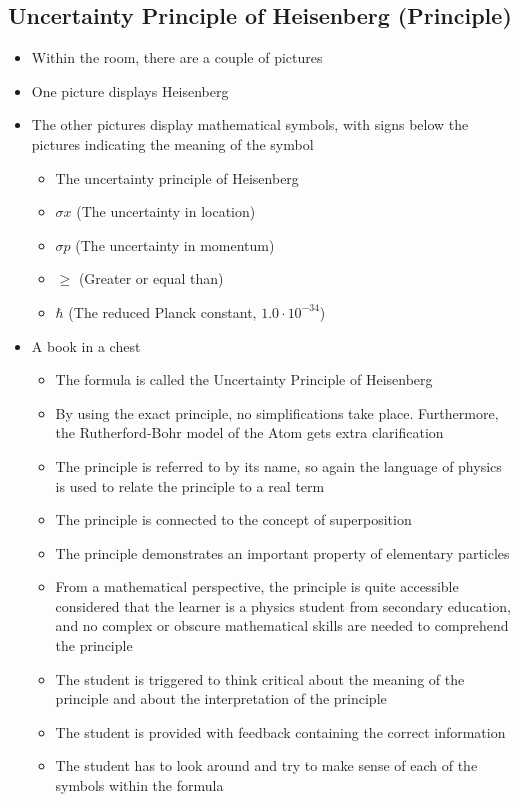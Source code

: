 \documentclass[11pt,twoside]{report} %
\begin{document}
\subsection{Uncertainty Principle of Heisenberg (Principle)}
\begin{itemize}
	\item Within the room, there are a couple of pictures
	\item One picture displays Heisenberg
	\item The other pictures display mathematical symbols, with signs below the pictures indicating the meaning of the symbol
	\begin{itemize}
		\item The uncertainty principle of Heisenberg
		\item $\sigma x$ (The uncertainty in location)
		\item $\sigma p$ (The uncertainty in momentum)
		\item $\geq$ (Greater or equal than)
		\item $\hbar$ (The reduced Planck constant, $1.0 \cdot 10^{-34}$)
	\end{itemize}
	\item A book in a chest
	\begin{itemize}
		\item The formula is called the Uncertainty Principle of Heisenberg
		\item By using the exact principle, no simplifications take place. Furthermore, the Rutherford-Bohr model of the Atom gets extra clarification
		\item The principle is referred to by its name, so again the language of physics is used to relate the principle to a real term
		\item The principle is connected to the concept of superposition
		\item The principle demonstrates an important property of elementary particles
		\item From a mathematical perspective, the principle is quite accessible considered that the learner is a physics student from secondary education, and no complex or obscure mathematical skills are needed to comprehend the principle
		\item The student is triggered to think critical about the meaning of the principle and about the interpretation of the principle
		\item The student is provided with feedback containing the correct information
		\item The student has to look around and try to make sense of each of the symbols within the formula

\end{itemize}
\end{itemize}
\end{document}
